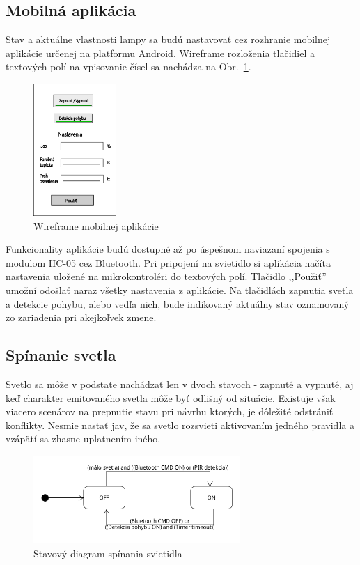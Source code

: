 \documentclass[12pt, a4paper]{article}
\begin{document}
\subsection{Mobilná aplikácia}
Stav a aktuálne vlastnosti lampy sa budú nastavovať cez rozhranie mobilnej aplikácie určenej na platformu Android. Wireframe rozloženia tlačidiel a textových polí na vpisovanie čísel sa nachádza na Obr.~\ref{fig:app-wireframe}.
\begin{figure}[h]
	\centering
	\includegraphics[width=0.28\textwidth]{assets/wireframe.png}
	\caption{Wireframe mobilnej aplikácie}
	\label{fig:app-wireframe}
\end{figure}

Funkcionality aplikácie budú dostupné až po úspešnom naviazaní spojenia s modulom HC-05 cez Bluetooth. Pri pripojení na svietidlo si aplikácia načíta nastavenia uložené na mikrokontroléri do textových polí. Tlačidlo ,,Použiť'' umožní odošlať naraz všetky nastavenia z aplikácie. Na tlačidlách zapnutia svetla a detekcie pohybu, alebo vedľa nich, bude indikovaný aktuálny stav oznamovaný zo zariadenia pri akejkoľvek zmene.
\FloatBarrier

\subsection{Spínanie svetla}
Svetlo sa môže v podstate nachádzať len v dvoch stavoch - zapnuté a vypnuté, aj keď charakter emitovaného svetla môže byť odlišný od situácie. Existuje však viacero scenárov na prepnutie stavu pri návrhu ktorých, je dôležité odstrániť konflikty. Nesmie nastať jav, že sa svetlo rozsvieti aktivovaním jedného pravidla a vzápätí sa zhasne uplatnením iného.
\begin{figure}[h]
    \centering
	\includegraphics[width=0.7\textwidth]{assets/light-states.png}
	\caption{Stavový diagram spínania svietidla}
	\label{fig:state-diagram-switch}
\end{figure}
\end{document}
